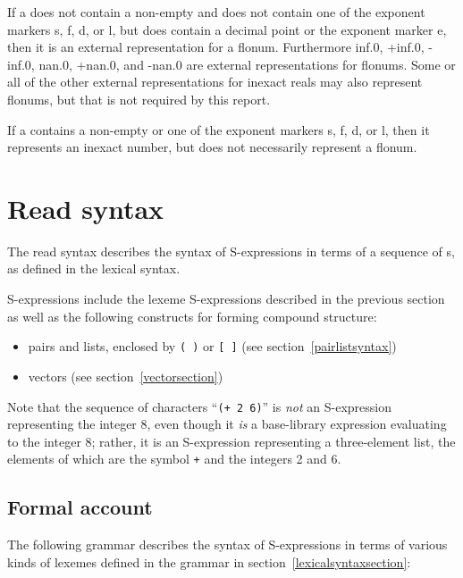 If a  does not contain a non-empty  and does not contain one of the exponent markers {\cf s},
{\cf f}, {\cf d}, or {\cf l}, but does contain a decimal point or the
exponent marker {\cf e}, then it is an external representation for a
flonum.  Furthermore {\cf inf.0}, {\cf +inf.0}, {\cf -inf.0}, {\cf
  nan.0}, {\cf +nan.0}, and {\cf -nan.0} are external representations
for flonums.  Some or all of the other external representations for
inexact reals may also represent flonums, but that is not required by
this report.

If a  contains a non-empty  or
one of the exponent markers {\cf s}, {\cf f}, {\cf d}, or {\cf l},
then it represents an inexact number, but does not necessarily
represent a flonum.

\section{Read syntax}
\label{readsyntaxsection}

The read syntax describes the syntax of
S-expressions in terms of a sequence of
s, as defined in the lexical syntax.

S-expressions include the lexeme S-expressions described in the
previous section as well as the following constructs for forming
compound structure:
%
\begin{itemize}
\item pairs and lists, enclosed by \verb|( )| or \verb|[ ]| (see
  section~\ref{pairlistsyntax})
\item  vectors (see section~\ref{vectorsection})
\end{itemize}

Note that the sequence of characters ``{\tt(+ 2 6)}'' is {\em not} an
S-expression representing the integer 8, even though it {\em is} a
base-library expression evaluating to the integer 8; rather, it is an
S-expression representing a three-element list, the elements of which
are the symbol {\tt +} and the integers 2 and 6.

\subsection{Formal account}
\label{datumsyntax}

The following grammar describes the syntax of S-expressions in terms
of various kinds of lexemes defined in the grammar in
section~\ref{lexicalsyntaxsection}:

